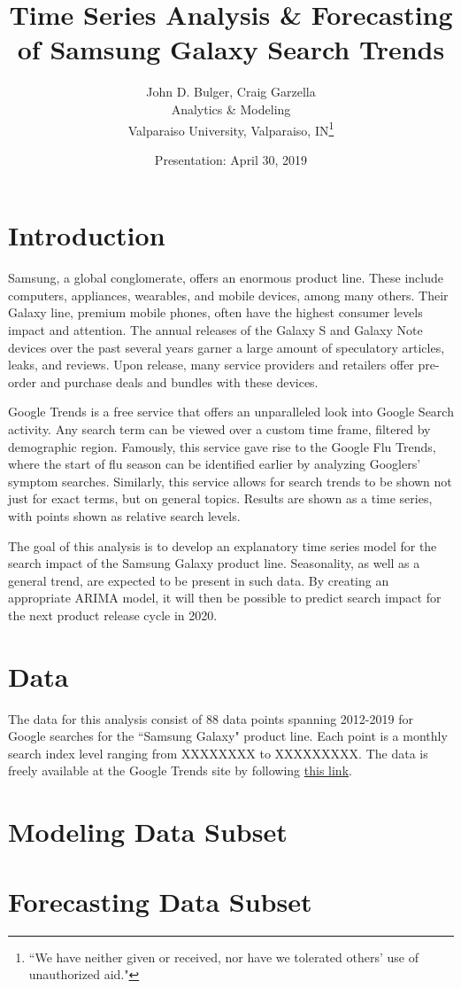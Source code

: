 \documentclass[12pt]{article}
\title{Time Series Analysis \& Forecasting of Samsung Galaxy Search Trends}
\author{John D. Bulger, Craig Garzella\\
	Analytics \& Modeling
	\\Valparaiso University, Valparaiso, IN\thanks{``We have neither given or received, nor have we tolerated others' use of unauthorized aid."}}
\date{Presentation: April 30, 2019}
\begin{document}
	\maketitle
	
	\section{Introduction}
	
	Samsung, a global conglomerate, offers an enormous product line.  These include computers, appliances, wearables, and mobile devices, among many others.  Their Galaxy line, premium mobile phones, often have the highest consumer levels impact and attention.  The annual releases of the Galaxy S and Galaxy Note devices over the past several years garner a large amount of speculatory articles, leaks, and reviews.  Upon release, many service providers and retailers offer pre-order and purchase deals and bundles with these devices.
	
	\par
	
	
	Google Trends is a free service that offers an unparalleled look into Google Search activity.  Any search term can be viewed over a custom time frame, filtered by demographic region.  Famously, this service gave rise to the Google Flu Trends, where the start of flu season can be identified earlier by analyzing Googlers' symptom searches.  Similarly, this service allows for search trends to be shown not just for exact terms, but on general topics.  Results are shown as a time series, with points shown as relative search levels.
	
	\par
	
	The goal of this analysis is to develop an explanatory time series model for the search impact of the Samsung Galaxy product line.  Seasonality, as well as a general trend, are expected to be present in such data.  By creating an appropriate ARIMA model, it will then be possible to predict search impact for the next product release cycle in 2020.
	
	\section{Data}
	
	The data for this analysis consist of 88 data points spanning 2012-2019 for Google searches for the ``Samsung Galaxy" product line.  Each point is a monthly search index level ranging from XXXXXXXX to XXXXXXXXX.  The data is freely available at the Google Trends site by following \href{https://trends.google.com/trends/explore?q=\%2Fm\%2F0hnbsn3\&geo=US}{this link}.
	

\newpage
\begin{thebibliography}{3}
	
	
\end{thebibliography}

\newpage
\begin{appendices}	
	\section{Modeling Data Subset}
	
\newpage

	\section{Forecasting Data Subset}

\end{appendices}
\end{document}
